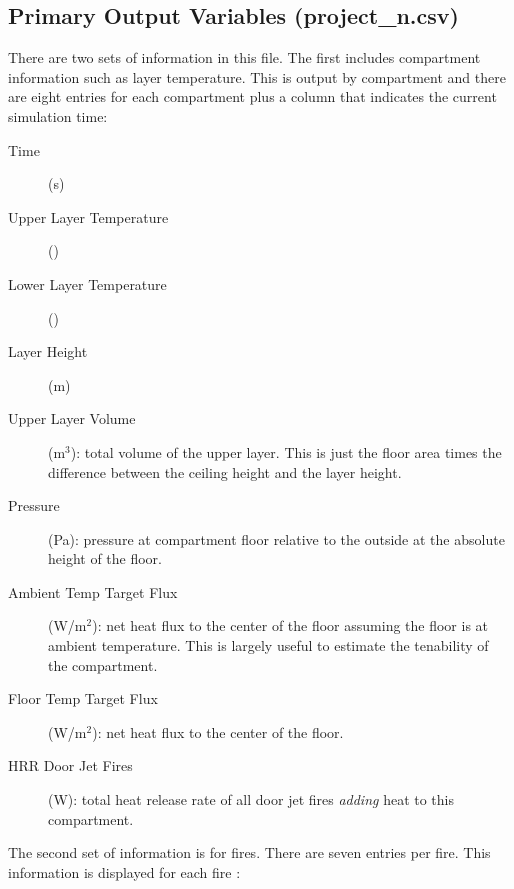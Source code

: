 \subsection{Primary Output Variables (project\_n.csv)}

There are two sets of information in this file. The first includes compartment information such as layer temperature. This is output by compartment and there are eight entries for each compartment plus a column that indicates the current simulation time:

\begin{description}
\item[Time] (s)
\item[Upper Layer Temperature] (\degc)
\item[Lower Layer Temperature] (\degc)
\item[Layer Height]  (m)
\item[ Upper Layer Volume] (m$^3$): total volume of the upper layer. This is just the floor area times the difference between the ceiling height and the layer height.
\item[ Pressure] (Pa): pressure at compartment floor relative to the outside at the absolute height of the floor.
\item[Ambient Temp Target Flux] (W/m$^2$): net heat flux to the center of the floor assuming the floor is at ambient temperature.  This is largely useful to estimate the tenability of the compartment.
\item[Floor Temp Target Flux] (W/m$^2$): net heat flux to the center of the floor.
\item[HRR Door Jet Fires] (W): total heat release rate of all door jet fires \emph{adding} heat to this compartment.
\end{description}
The second set of information is for fires. There are seven entries per fire.  This information is displayed for each fire :
